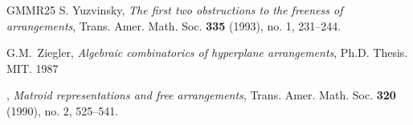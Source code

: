 \documentclass[12pt]{amsart}
\numberwithin{equation}{section}
\theoremstyle{plain}
\theoremstyle{definition}
\begin{document}
\begin{thebibliography}{GMMR25}
S. Yuzvinsky,
\emph{The first two obstructions to the freeness of arrangements},
Trans. Amer. Math. Soc. \textbf{335} (1993), no. 1, 231--244.

G.M.~Ziegler,
\emph{Algebraic combinatorics of hyperplane arrangements}, Ph.D. Thesis. MIT. 1987

\bysame, %
\emph{Matroid representations and free arrangements}, 
Trans. Amer. Math. Soc. \textbf{320} (1990), no. 2, 525--541.

\end{thebibliography}

\end{document}
